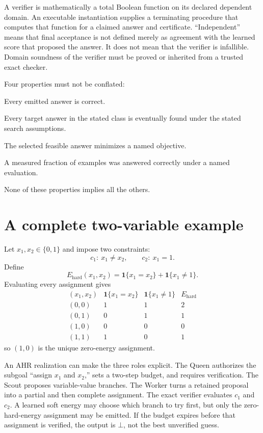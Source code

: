 \documentclass[11pt,oneside]{book}
\theoremstyle{remark}
\newcommand{\one}{\mathbf 1}
\begin{document}
A verifier is mathematically a total Boolean function on its declared
dependent domain. An executable instantiation supplies a terminating procedure
that computes that function for a claimed answer and certificate.
``Independent'' means that final acceptance is not defined merely as agreement
with the learned score that proposed the answer. It does not mean that the
verifier is infallible. Domain soundness of the verifier must be proved or
inherited from a trusted exact checker.

Four properties must not be conflated:
\begin{description}[style=nextline,leftmargin=32mm,labelwidth=29mm]
\item[Soundness] Every emitted answer is correct.
\item[Completeness] Every target answer in the stated class is eventually found
under the stated search assumptions.
\item[Optimality] The selected feasible answer minimizes a named objective.
\item[Empirical accuracy] A measured fraction of examples was answered
correctly under a named evaluation.
\end{description}
None of these properties implies all the others.

\section*{A complete two-variable example}

Let $x_1,x_2\in\{0,1\}$ and impose two constraints:
\[
c_1:\ x_1\ne x_2,
\qquad
c_2:\ x_1=1.
\]
Define
\[
E_{\mathrm{hard}}(x_1,x_2)
=\one\{x_1=x_2\}+\one\{x_1\ne1\}.
\]
Evaluating every assignment gives
\[
\begin{array}{c|cc|c}
(x_1,x_2)&\one\{x_1=x_2\}&\one\{x_1\ne1\}&E_{\mathrm{hard}}\\
\hline
(0,0)&1&1&2\\
(0,1)&0&1&1\\
(1,0)&0&0&0\\
(1,1)&1&0&1
\end{array}
\]
so $(1,0)$ is the unique zero-energy assignment.

An AHR realization can make the three roles explicit. The Queen authorizes
the subgoal ``assign $x_1$ and $x_2$,'' sets a two-step budget, and requires
verification. The Scout proposes variable-value branches. The Worker turns a
retained proposal into a partial and then complete assignment. The exact
verifier evaluates $c_1$ and $c_2$. A learned soft energy may choose which
branch to try first, but only the zero-hard-energy assignment may be emitted.
If the budget expires before that assignment is verified, the output is
$\bot$, not the best unverified guess.
\end{document}

